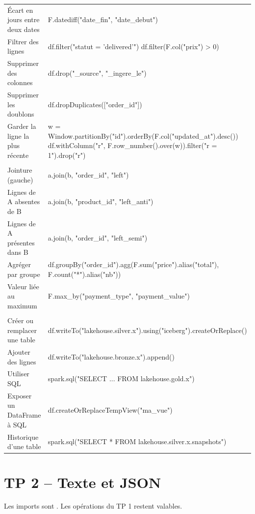 \begin{center}
\begin{tabularx}{\textwidth}{@{}>{\raggedright\arraybackslash}p{4.1cm} >{\raggedright\arraybackslash\ttfamily\footnotesize}X@{}}
Écart en jours entre deux dates & F.datediff("date\_fin", "date\_debut") \\
Filtrer des lignes & df.filter("statut = 'delivered'") \quad df.filter(F.col("prix") > 0) \\
Supprimer des colonnes & df.drop("\_source", "\_ingere\_le") \\
Supprimer les doublons & df.dropDuplicates(["order\_id"]) \\
Garder la ligne la plus récente & w = Window.partitionBy("id").orderBy(F.col("updated\_at").desc()) \newline
  df.withColumn("r", F.row\_number().over(w)).filter("r = 1").drop("r") \\
\midrule
\multicolumn{2}{@{}l}{\textbf{\textcolor{lhblue}{Combiner et agréger}}} \\
Jointure (gauche) & a.join(b, "order\_id", "left") \\
Lignes de A absentes de B & a.join(b, "product\_id", "left\_anti") \\
Lignes de A présentes dans B & a.join(b, "order\_id", "left\_semi") \\
Agréger par groupe & df.groupBy("order\_id").agg(F.sum("price").alias("total"), F.count("*").alias("nb")) \\
Valeur liée au maximum & F.max\_by("payment\_type", "payment\_value") \\
\midrule
\multicolumn{2}{@{}l}{\textbf{\textcolor{lhblue}{Écrire (tables Iceberg)}}} \\
Créer ou remplacer une table & df.writeTo("lakehouse.silver.x").using("iceberg").createOrReplace() \\
Ajouter des lignes & df.writeTo("lakehouse.bronze.x").append() \\
Utiliser SQL & spark.sql("SELECT ... FROM lakehouse.gold.x") \\
Exposer un DataFrame à SQL & df.createOrReplaceTempView("ma\_vue") \\
Historique d'une table & spark.sql("SELECT * FROM lakehouse.silver.x.snapshots") \\
\bottomrule
\end{tabularx}
\end{center}

\section{TP 2 -- Texte et JSON}\label{ann:aide-c4}

Les imports sont . Les opérations du TP 1 restent valables.

